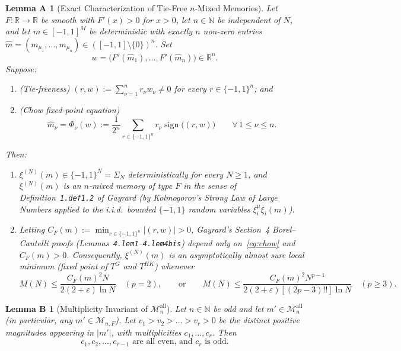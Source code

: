 \documentclass[11pt]{article}
\newtheorem*{lemmaA}{Lemma A}
\newtheorem*{lemmaB}{Lemma B}
\theoremstyle{definition}
\theoremstyle{remark}
\DeclareMathOperator{\sign}{sign}
\begin{document}
\begin{lemmaA}[Exact Characterization of Tie-Free $n$-Mixed Memories]
Let $F : \mathbb{R} \to \mathbb{R}$ be smooth with $F'(x) > 0$ for $x > 0$, let $n \in \mathbb{N}$ be independent of $N$, and let $m \in [-1,1]^M$ be deterministic with exactly $n$ non-zero entries $\hat{m} = (m_{\mu_1}, \dots, m_{\mu_n}) \in ([-1,1]\setminus\{0\})^n$. Set
\[
  w = \bigl(F'(\hat{m}_1), \dots, F'(\hat{m}_n)\bigr) \in \mathbb{R}^n.
\]
Suppose:
\begin{enumerate}[leftmargin=2em,itemsep=2pt]
  \item \emph{(Tie-freeness)} $(r, w) := \sum_{\nu=1}^n r_\nu w_\nu \neq 0$ for every $r \in \{-1,1\}^n$; and
  \item \emph{(Chow fixed-point equation)}
  \begin{equation}\label{eq:chow}
    \hat{m}_\nu = \Phi_\nu(w) := \frac{1}{2^n} \sum_{r \in \{-1,1\}^n} r_\nu \sign\bigl((r, w)\bigr)
    \qquad \forall\, 1 \le \nu \le n. \tag{$\star$}
  \end{equation}
\end{enumerate}
Then:
\begin{enumerate}[label=\textup{(\alph*)},leftmargin=2em,itemsep=2pt]
  \item $\xi^{(N)}(m) \in \{-1,1\}^N = \Sigma_N$ deterministically for every $N \ge 1$, and $\xi^{(N)}(m)$ is an $n$-mixed memory of type $F$ in the sense of Definition~\texttt{1.def1.2} of Gayrard (by Kolmogorov's Strong Law of Large Numbers applied to the i.i.d.\ bounded $\{-1,1\}$ random variables $\xi_i^\mu \xi_i(m)$).
  \item Letting $C_F(m) := \min_{r \in \{-1,1\}^n} |(r, w)| > 0$, Gayrard's Section~4 Borel--Cantelli proofs (Lemmas~\texttt{4.lem1}--\texttt{4.lem4bis}) depend only on~\eqref{eq:chow} and $C_F(m) > 0$. Consequently, $\xi^{(N)}(m)$ is an asymptotically almost sure local minimum (fixed point of $T^G$ and $T^{HK}$) whenever
  \[
    M(N) \le \frac{C_F(m)^2 N}{2(2+\varepsilon)\ln N} \quad (p=2),
    \qquad\text{or}\qquad
    M(N) \le \frac{C_F(m)^2 N^{p-1}}{2(2+\varepsilon)[(2p-3)!!]\ln N} \quad (p \ge 3).
  \]
\end{enumerate}
\end{lemmaA}

\begin{lemmaB}[Multiplicity Invariant of $\mathcal{M}_n^{\mathrm{all}}$]
Let $n \in \mathbb{N}$ be odd and let $m' \in \mathcal{M}_n^{\mathrm{all}}$ (in particular, any $m' \in \mathcal{M}_{n,F}$). Let $v_1 > v_2 > \dots > v_r > 0$ be the distinct positive magnitudes appearing in $|m'|$, with multiplicities $c_1, \dots, c_r$. Then
\[
  c_1, c_2, \dots, c_{r-1} \text{ are all even, and } c_r \text{ is odd.}
\]
\end{lemmaB}
\end{document}
